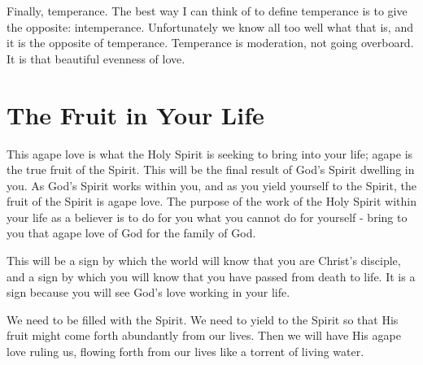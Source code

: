 Finally, temperance. The best way I can think of to define temperance is to give the opposite: intemperance. Unfortunately we know all too well what that is, and it is the opposite of temperance. Temperance is moderation, not going overboard. It is that beautiful evenness of love. 

\section*{The Fruit in Your Life}

This agape love is what the Holy Spirit is seeking to bring into your life; agape is the true fruit of the Spirit. This will be the final result of God's Spirit dwelling in you. As God's Spirit works within you, and as you yield yourself to the Spirit, the fruit of the Spirit is agape love. The purpose of the work of the Holy Spirit within your life as a believer is to do for you what you cannot do for yourself - bring to you that agape love of God for the family of God. 

This will be a sign by which the world will know that you are Christ's disciple, and a sign by which you will know that you have passed from death to life. It is a sign because you will see God's love working in your life. 

We need to be filled with the Spirit. We need to yield to the Spirit so that His fruit might come forth abundantly from our lives. Then we will have His agape love ruling us, flowing forth from our lives like a torrent of living water. 



